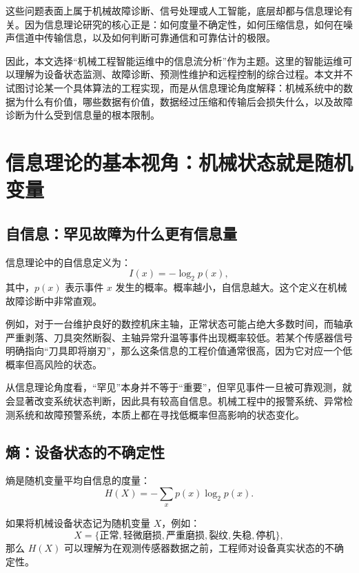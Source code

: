 \documentclass[UTF8,a4paper,12pt]{ctexart}
\begin{document}
这些问题表面上属于机械故障诊断、信号处理或人工智能，底层却都与信息理论有关。因为信息理论研究的核心正是：如何度量不确定性，如何压缩信息，如何在噪声信道中传输信息，以及如何判断可靠通信和可靠估计的极限。

因此，本文选择“机械工程智能运维中的信息流分析”作为主题。这里的智能运维可以理解为设备状态监测、故障诊断、预测性维护和远程控制的综合过程。本文并不试图讨论某一个具体算法的工程实现，而是从信息理论角度解释：机械系统中的数据为什么有价值，哪些数据有价值，数据经过压缩和传输后会损失什么，以及故障诊断为什么受到信息量的根本限制。

\section{信息理论的基本视角：机械状态就是随机变量}

\subsection{自信息：罕见故障为什么更有信息量}

信息理论中的自信息定义为：
\begin{equation}
I(x)=-\log_2 p(x),
\end{equation}
其中，$p(x)$ 表示事件 $x$ 发生的概率。概率越小，自信息越大。这个定义在机械故障诊断中非常直观。

例如，对于一台维护良好的数控机床主轴，正常状态可能占绝大多数时间，而轴承严重剥落、刀具突然断裂、主轴异常升温等事件出现概率较低。若某个传感器信号明确指向“刀具即将崩刃”，那么这条信息的工程价值通常很高，因为它对应一个低概率但高风险的状态。

从信息理论角度看，“罕见”本身并不等于“重要”，但罕见事件一旦被可靠观测，就会显著改变系统状态判断，因此具有较高自信息。机械工程中的报警系统、异常检测系统和故障预警系统，本质上都在寻找低概率但高影响的状态变化。

\subsection{熵：设备状态的不确定性}

熵是随机变量平均自信息的度量：
\begin{equation}
H(X)=-\sum_x p(x)\log_2 p(x).
\end{equation}

如果将机械设备状态记为随机变量 $X$，例如：
\[
X=\{\text{正常},\text{轻微磨损},\text{严重磨损},\text{裂纹},\text{失稳},\text{停机}\},
\]
那么 $H(X)$ 可以理解为在观测传感器数据之前，工程师对设备真实状态的不确定性。
\end{document}
